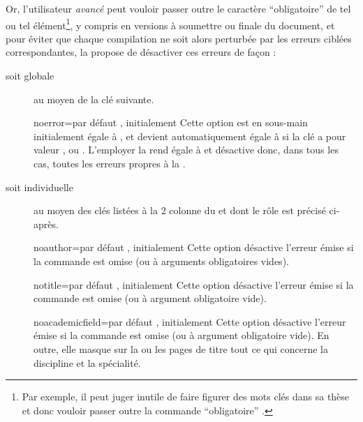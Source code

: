 Or, l'utilisateur \emph{avancé} peut vouloir passer outre le caractère
\enquote{obligatoire} de tel ou tel élément\footnote{Par exemple, il peut juger
  inutile de faire figurer des mots clés dans sa thèse et donc vouloir passer
  outre la commande \enquote{obligatoire} \protect{}.},
y compris en versions à soumettre ou finale du document, et pour éviter que
chaque compilation ne soit alors perturbée par les erreurs ciblées
correspondantes, la \yatCl{} propose de désactiver ces erreurs de façon :
\begin{description}
\item[soit globale] au moyen de la clé  suivante.
  \begin{docKey}{noerror}{=\textbar{}}{par défaut
      , initialement }
    Cette option est en sous-main initialement égale à , et
    devient automatiquement égale à  si la clé 
    a pour valeur ,  ou
    . L'employer la rend égale à  et désactive
    donc, dans tous les cas, toutes les erreurs propres à la \yatCl{}.
  \end{docKey}
\item[soit individuelle] au moyen des clés listées à la 2\ieme{} colonne du
   et dont le rôle est précisé ci-après.
  \begin{docKey}{noauthor}{=\textbar{}}{par défaut
      , initialement }
    Cette option désactive l'erreur émise si la commande  est
    omise (ou à arguments obligatoires vides).
  \end{docKey}
  \begin{docKey}{notitle}{=\textbar{}}{par défaut
      , initialement }
    Cette option désactive l'erreur émise si la commande  est
    omise (ou à argument obligatoire vide).
  \end{docKey}
  \begin{docKey}{noacademicfield}{=\textbar{}}{par
      défaut , initialement }
    Cette option désactive l'erreur émise si la commande 
    est omise (ou à argument obligatoire vide). En outre, elle masque sur la ou
    les pages de titre tout ce qui concerne la discipline  et la spécialité.

\end{docKey}
\end{description}
